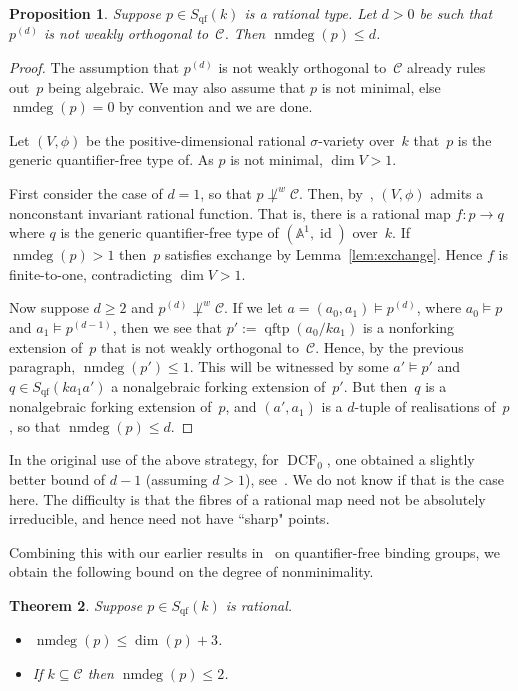 \documentclass[\DocOpts]{amsart}
\newtheorem{theorem}{Theorem}[section]
\newtheorem{proposition}[theorem]{Proposition}
\theoremstyle{definition}
\def\dcf{\operatorname{DCF}}
\def\qftp{\operatorname{qftp}}
\def\qf{\operatorname{qf}}
\def\nmdeg{\operatorname{nmdeg}}
\def\C{\mathcal{C}}
\renewcommand{\AA}{\mathbb{A}}
\providecommand{\id}{\operatorname{id}}
\newcommand{\<}{\langle}
\renewcommand{\>}{\rangle}
\begin{document}
\begin{proposition}\label{prop:redtowoc-nmdeg}
Suppose $p\in S_{\qf}(k)$ is a rational type.
Let $d>0$ be such that $p^{(d)}$ is not weakly orthogonal to~$\C$.
Then $\nmdeg(p)\leq d$.
\end{proposition}

\begin{proof}
The assumption that $p^{(d)}$ is not weakly orthogonal to~$\C$ already rules out~$p$ being algebraic.
We may also assume that $p$ is not minimal, else $\nmdeg(p)=0$ by convention and we are done.

Let $(V,\phi)$ be the positive-dimensional rational $\sigma$-variety over~$k$ that~$p$ is the generic quantifier-free type of.
As $p$ is not minimal, $\dim V>1$.

First consider the case of $d=1$, so that $p\not\perp^w\C$.
Then, by~\cite[Proposition~3.4(a)]{qfint},  $(V,\phi)$ admits a nonconstant invariant rational function.
That is, there is a rational map $f:p\to q$ where $q$ is the generic quantifier-free type of $(\AA^1,\id)$ over~$k$.
If $\nmdeg(p)>1$ then~$p$ satisfies exchange by Lemma~\ref{lem:exchange}.
Hence $f$ is finite-to-one, contradicting $\dim V>1$.

Now suppose $d\geq 2$ and $p^{(d)}\not\perp^w\C$.
If we let $a=(a_0,a_1)\models p^{(d)}$, where $a_0\models p$ and $a_1\models p^{(d-1)}$, then we see that $p':=\qftp(a_0/ka_1)$ is a nonforking extension of~$p$ that is not weakly orthogonal to~$\C$.
Hence, by the previous paragraph, $\nmdeg(p')\leq 1$.
This will be witnessed by some $a'\models p'$ and $q\in S_{\qf}({ka_1a'})$ a nonalgebraic forking extension of~$p'$.
But then~$q$ is a nonalgebraic forking extension of~$p$, and $(a',a_1)$ is a $d$-tuple of realisations of~$p$, so that $\nmdeg(p)\leq d$.
\end{proof}

In the original use of the above strategy, for $\dcf_0$, one obtained a slightly better bound of $d-1$ (assuming $d>1$), see~\cite[Proposition 7.1]{nmdeg}.
We do not know if that is the case here.
The difficulty is that the fibres of a rational map need not be absolutely irreducible, and hence need not have ``sharp" points.

Combining this with our earlier results in~\cite{qfint} on quantifier-free binding groups, we obtain the following bound on the degree of nonminimality.

\begin{theorem}
\label{thm:nmdeg}
Suppose $p\in S_{\qf}(k)$ is rational.
\begin{itemize}
\item[(a)]
$\nmdeg(p)\leq\dim(p)+3$.
\item[(b)]
If $k\subseteq\C$ then $\nmdeg(p)\leq 2$.
\end{itemize}
\end{theorem}
\end{document}
